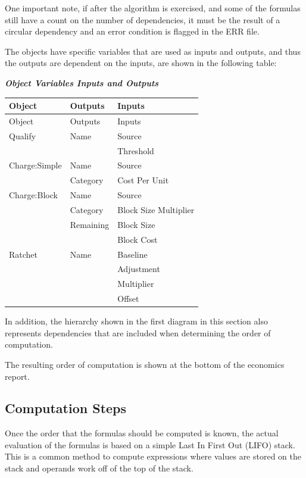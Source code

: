 One important note, if after the algorithm is exercised, and some of the formulas still have a count on the number of dependencies, it must be the result of a circular dependency and an error condition is flagged in the ERR file.

The objects have specific variables that are used as inputs and outputs, and thus the outputs are dependent on the inputs, are shown in the following table:

\textbf{\emph{Object Variables Inputs and Outputs}}

\begin{longtable}[c]{@{}lll@{}}
\toprule 
Object & Outputs & Inputs \tabularnewline \midrule
\endfirsthead

\toprule 
Object & Outputs & Inputs \tabularnewline \midrule
\endhead

Qualify & Name & Source \tabularnewline
~ & ~ & Threshold \tabularnewline
Charge:Simple & Name & Source \tabularnewline
~ & Category & Cost Per Unit \tabularnewline
Charge:Block & Name & Source \tabularnewline
~ & Category & Block Size Multiplier \tabularnewline
~ & Remaining & Block Size \tabularnewline
~ & ~ & Block Cost \tabularnewline
Ratchet & Name & Baseline \tabularnewline
~ & ~ & Adjustment \tabularnewline
~ & ~ & Multiplier \tabularnewline
~ & ~ & Offset \tabularnewline
\bottomrule
\end{longtable}

In addition, the hierarchy shown in the first diagram in this section also represents dependencies that are included when determining the order of computation.

The resulting order of computation is shown at the bottom of the economics report.

\subsection{Computation Steps}\label{computation-steps}

Once the order that the formulas should be computed is known, the actual evaluation of the formulas is based on a simple Last In First Out (LIFO) stack.~ This is a common method to compute expressions where values are stored on the stack and operands work off of the top of the stack.
